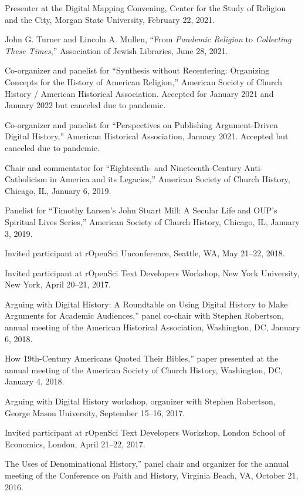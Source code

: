 \documentclass[11pt]{article}
\begin{document}
Presenter at the Digital Mapping Convening, Center for the Study of Religion and the City, Morgan State University, February 22, 2021.

John G. Turner and Lincoln A. Mullen, ``From \emph{Pandemic Religion} to \emph{Collecting These Times},'' Association of Jewish Libraries, June 28, 2021.

Co-organizer and panelist for ``Synthesis without Recentering: Organizing Concepts for the History of American Religion,'' American Society of Church History / American Historical Association. Accepted for January 2021 and January 2022 but canceled due to pandemic.

Co-organizer and panelist for ``Perspectives on Publishing Argument-Driven Digital History,'' American Historical Association, January 2021. Accepted but canceled due to pandemic.

Chair and commentator for ``Eighteenth- and Nineteenth-Century Anti-Catholicism in America and its Legacies,'' American Society of Church History, Chicago, IL, January 6, 2019.

Panelist for ``Timothy Larsen's John Stuart Mill: A Secular Life and OUP's Spiritual Lives Series,'' American Society of Church History, Chicago, IL, January 3, 2019.

Invited participant at rOpenSci Unconference, Seattle, WA, May 21--22, 2018.

Invited participant at rOpenSci Text Developers Workshop, New York University, New York, April 20--21, 2017.

\noindent{}Arguing with Digital History: A Roundtable on Using Digital History to Make Arguments for Academic Audiences,'' panel co-chair with Stephen Robertson, annual meeting of the American Historical Association, Washington, DC, January 6, 2018.

\noindent{}How 19th-Century Americans Quoted Their Bibles,'' paper presented at the annual meeting of the American Society of Church History, Washington, DC, January 4, 2018.

Arguing with Digital History workshop, organizer with Stephen Robertson, George Mason University, September 15--16, 2017.

Invited participant at rOpenSci Text Developers Workshop, London School of Economics, London, April 21--22, 2017.

\noindent{}The Uses of Denominational History,'' panel chair and organizer for the annual meeting of the Conference on Faith and History, Virginia Beach, VA, October 21, 2016.
\end{document}
